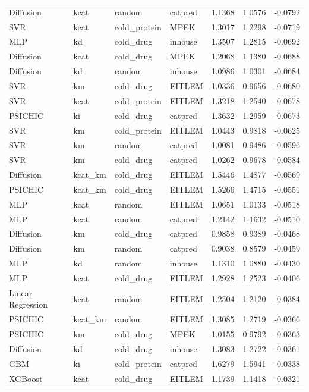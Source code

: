 \begin{tabular}{llllrrr}
Diffusion & kcat & random & catpred & 1.1368 & 1.0576 & -0.0792 \\
SVR & kcat & cold_protein & MPEK & 1.3017 & 1.2298 & -0.0719 \\
MLP & kd & cold_drug & inhouse & 1.3507 & 1.2815 & -0.0692 \\
Diffusion & kcat & cold_drug & MPEK & 1.2068 & 1.1380 & -0.0688 \\
Diffusion & kd & random & inhouse & 1.0986 & 1.0301 & -0.0684 \\
SVR & km & cold_drug & EITLEM & 1.0336 & 0.9656 & -0.0680 \\
SVR & kcat & cold_protein & EITLEM & 1.3218 & 1.2540 & -0.0678 \\
PSICHIC & ki & cold_drug & catpred & 1.3632 & 1.2959 & -0.0673 \\
SVR & km & cold_protein & EITLEM & 1.0443 & 0.9818 & -0.0625 \\
SVR & km & random & catpred & 1.0081 & 0.9486 & -0.0596 \\
SVR & km & cold_drug & catpred & 1.0262 & 0.9678 & -0.0584 \\
Diffusion & kcat_km & cold_drug & EITLEM & 1.5446 & 1.4877 & -0.0569 \\
PSICHIC & kcat_km & cold_drug & EITLEM & 1.5266 & 1.4715 & -0.0551 \\
MLP & kcat & random & EITLEM & 1.0651 & 1.0133 & -0.0518 \\
MLP & kcat & random & catpred & 1.2142 & 1.1632 & -0.0510 \\
Diffusion & km & cold_drug & catpred & 0.9858 & 0.9389 & -0.0468 \\
Diffusion & km & random & catpred & 0.9038 & 0.8579 & -0.0459 \\
MLP & kd & random & inhouse & 1.1310 & 1.0880 & -0.0430 \\
MLP & kcat & cold_drug & EITLEM & 1.2928 & 1.2523 & -0.0406 \\
Linear Regression & kcat & random & EITLEM & 1.2504 & 1.2120 & -0.0384 \\
PSICHIC & kcat_km & random & EITLEM & 1.3085 & 1.2719 & -0.0366 \\
PSICHIC & km & cold_drug & MPEK & 1.0155 & 0.9792 & -0.0363 \\
Diffusion & kd & cold_drug & inhouse & 1.3083 & 1.2722 & -0.0361 \\
GBM & ki & cold_protein & catpred & 1.6279 & 1.5941 & -0.0338 \\
XGBoost & kcat & cold_drug & EITLEM & 1.1739 & 1.1418 & -0.0321 \\

\end{tabular}
